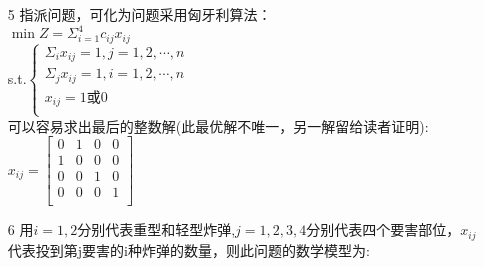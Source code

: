 \documentclass[a4paper,20pt]{article}
\begin{document}
\begin{itemize}
    
       \item[5] 指派问题，可化为问题采用匈牙利算法：
     \\$\min Z =\Sigma_{i=1}^{4}c_{ij}x_{ij}$
     \\s.t.$\left\{ \begin{matrix}
        \Sigma_{i}x_{ij}=1,j=1,2,\cdots,n\\
        \Sigma_{j}x_{ij}=1,i=1,2,\cdots,n\\
        x_{ij}=1\mbox{或}0\\
    \end{matrix} \right.$
            \\ 可以容易求出最后的整数解(此最优解不唯一，另一解留给读者证明):
            \\ $x_{ij}=\begin{bmatrix}
                0	&1&	0	&0\\
1	&0	&0	&0\\
0	&0	&1	&0\\
0	&0	&0	&1\\
             \end{bmatrix}
$

\item[6]用$i=1,2$分别代表重型和轻型炸弹,$j=1,2,3,4$分别代表四个要害部位，$x_{ij}$代表投到第j要害的i种炸弹的数量，则此问题的数学模型为:\\
    

\end{itemize}
\end{document}
